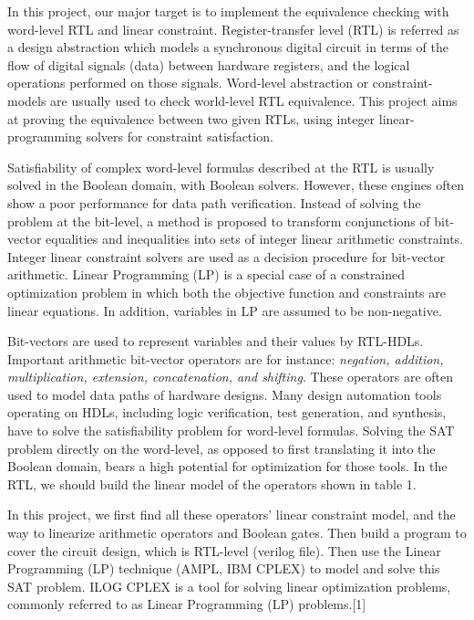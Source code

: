\documentclass[conference,11pt]{IEEEtran}
\begin{document}
In this project, our major target is to implement the equivalence checking with word-level RTL and linear constraint. Register-transfer level (RTL) is referred as a design abstraction which models a synchronous digital circuit in terms of the flow of digital signals (data) between hardware registers, and the logical operations performed on those signals. Word-level abstraction or constraint-models are usually used to check world-level RTL equivalence. This project aims at proving the equivalence between two given RTLs, using integer linear-programming solvers for constraint satisfaction.


Satisfiability of complex word-level formulas described at the RTL is usually solved in the Boolean domain, with Boolean solvers. However, these engines often show a poor performance for data path verification. Instead of solving the problem at the bit-level, a method is proposed to transform conjunctions of bit-vector equalities and inequalities into sets of integer linear arithmetic constraints. Integer linear constraint solvers are used as a decision procedure for bit-vector arithmetic. Linear Programming (LP) is a special case of a constrained optimization problem in which both the objective function and constraints are linear equations. In addition, variables in LP are assumed to be non-negative.

 Bit-vectors are used to represent variables and their values by RTL-HDLs.  Important arithmetic bit-vector operators are for instance: \emph {negation, addition, multiplication, extension, concatenation, and shifting}. These operators are often used to model data paths of hardware designs.  Many design automation tools operating on HDLs, including logic verification, test generation, and synthesis, have to solve the satisfiability problem for word-level formulas.  Solving the SAT problem directly on the word-level, as opposed to ﬁrst translating it into the Boolean domain, bears a high potential for optimization for those tools.  In the RTL, we should build the linear model of the operators shown in table 1.

In this project, we first find all these operators’ linear constraint model, and the way to linearize arithmetic operators and Boolean gates. Then build a program to cover the circuit design, which is RTL-level (verilog file). Then use the Linear Programming (LP) technique (AMPL, IBM CPLEX) to model and solve this SAT problem.  ILOG CPLEX is a tool for solving linear optimization problems, commonly referred to as Linear Programming (LP) problems.[1]
\end{document}
